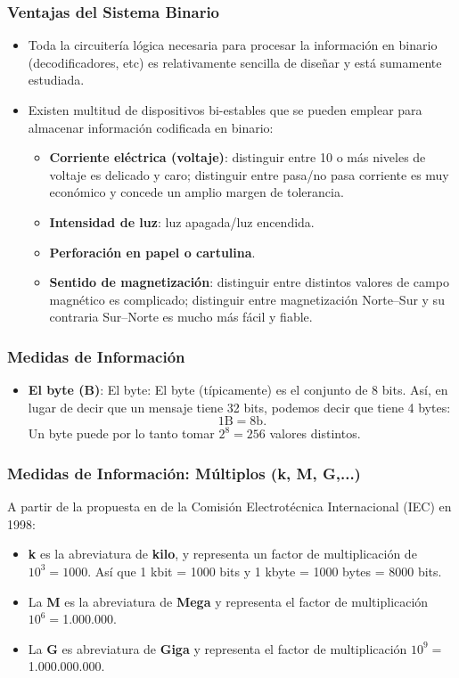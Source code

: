 \documentclass{beamer}
\begin{document}
\begin{frame}[fragile]\frametitle{Ventajas del Sistema Binario}
\begin{itemize}
	\item Toda la circuitería lógica necesaria para procesar la información en binario (decodificadores, etc) es relativamente sencilla de diseñar y está sumamente estudiada.

\item Existen multitud de dispositivos bi-estables que se pueden emplear para almacenar información codificada en binario:
\begin{itemize}
	\item \textbf{Corriente eléctrica (voltaje)}: distinguir entre 10 o más niveles de voltaje es delicado y caro; distinguir entre pasa/no pasa corriente es muy económico y concede un amplio margen de tolerancia.
	\item \textbf{Intensidad de luz}: luz apagada/luz encendida.
	\item \textbf{Perforación en papel o cartulina}.
	\item \textbf{Sentido de magnetización}: distinguir entre distintos valores de campo magnético es complicado; distinguir entre magnetización Norte--Sur y su contraria Sur--Norte es mucho más fácil y fiable.
\end{itemize}
\end{itemize}
\end{frame}


\begin{frame}[fragile]\frametitle{Medidas de Información}
\begin{itemize}
\item \textbf{El byte (B)}: El byte:  El byte (típicamente) es el conjunto de 8 bits. Así, en lugar de decir que un mensaje tiene 32 bits, podemos decir que tiene 4 bytes:
$$
1 \text{B} = 8 \text{b}.
$$
Un byte puede por lo tanto tomar $2^8=256$ valores distintos. 
\end{itemize}
\end{frame}


\begin{frame}[fragile]\frametitle{Medidas de Información: Múltiplos (k, M, G,...)}
A partir de la propuesta en de la Comisión Electrotécnica Internacional (IEC) en 1998:
\begin{itemize}
	\item \textbf{k} es la abreviatura de \textbf{kilo}, y representa un factor de multiplicación de $10^3=1000$. Así que 1 kbit = 1000 bits y 1 kbyte = 1000 bytes = 8000 bits. 
	
	\item La \textbf{M} es la abreviatura de \textbf{Mega} y representa el factor de multiplicación $10^{6}= $1.000.000.
	
	\item La \textbf{G} es abreviatura de \textbf{Giga} y representa el factor de multiplicación $10^{9} = $1.000.000.000.
\end{itemize}
\end{frame}
\end{document}
